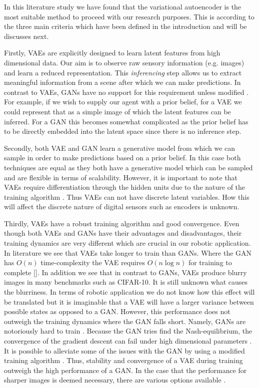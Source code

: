 \documentclass[main.tex]{subfiles}
\begin{document}
In this literature study we have found that the variational autoencoder is the most suitable method to proceed with our research purposes. This is according to the three main criteria which have been defined in the introduction and will be discusses next.

Firstly, VAEs are explicitly designed to learn latent features from high dimensional data. Our aim is to observe raw sensory information (e.g. images) and learn a reduced representation. This \textit{inferencing} step allows us to extract meaningful information from a scene after which we can make predictions. In contrast to VAEs, GANs have no support for this requirement unless modified \cite{mescheder2017adversarial,chen2016infogan}. For example, if we wish to supply our agent with a prior belief, for a VAE we could represent that as a simple image of which the latent features can be inferred. For a GAN this becomes somewhat complicated as the prior belief has to be directly embedded into the latent space since there is no inference step. 

Secondly, both VAE and GAN learn a generative model from which we can sample in order to make predictions based on a prior belief. In this case both techniques are equal as they both have a generative model which can be sampled and are flexible in terms of scalability. However, it is important to note that VAEs require differentiation through the hidden units due to the nature of the training algorithm \cite{goodfellow2014generative}. Thus VAEs can not have discrete latent variables. How this will affect the discrete nature of digital sensors such as encoders is unknown.

Thirdly, VAEs have a robust training algorithm and good convergence. Even though both VAEs and GANs have their advantages and disadvantages, their training dynamics are very different which are crucial in our robotic application. In literature we see that VAEs take longer to train than GANs. Where the GAN has $O(n)$ time-complexity the VAE requires $O(n \log n)$ for training to complete []. In addition we see that  in contrast to GANs, VAEs produce blurry images in many benchmarks such as CIFAR-10. It is still unknown what causes the blurriness. In terms of robotic application we do not know how this effect will be translated but it is imaginable that a VAE will have a larger variance between possible states as opposed to a GAN. However, this performance does not outweigh the training dynamics where the GAN falls short. Namely, GANs are notoriously hard to train \cite{Goodfellow-et-al-2016, arjovsky2017towards}. Because the GAN tries find the Nash-equilibrium, the convergence of the gradient descent can fail under high dimensional parameters \cite{goodfellow2014distinguishability}. It is possible to alleviate some of the issues with the GAN by using a modified training algorithm \cite{arjovsky2017wasserstein}. Thus, stability and convergence of a VAE during training outweigh the high performance of a GAN. In the case that the performance for sharper images is deemed necessary, there are various options available \cite{mescheder2017adversarial, rezende2015variational, salimans2015markov}.
\end{document}
